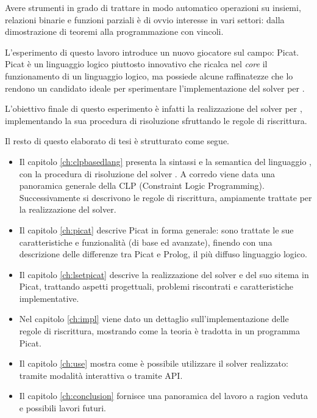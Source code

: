 \documentclass[12pt,a4paper,openright]{book}  %
\begin{document}
Avere strumenti in grado di trattare in modo automatico operazioni su
insiemi, relazioni binarie e funzioni parziali è di ovvio interesse in
vari settori: dalla dimostrazione di teoremi alla programmazione con
vincoli.

L'esperimento di questo lavoro introduce un nuovo giocatore sul campo:
Picat. Picat è un linguaggio logico piuttosto innovativo che ricalca
nel \textit{core} il funzionamento di un linguaggio logico, ma
possiede alcune raffinatezze che lo rendono un candidato ideale per
sperimentare l'implementazione del solver per \lset{}.

L'obiettivo finale di questo esperimento è infatti la realizzazione
del solver \satset{} per \lset{}, implementando la sua procedura di
risoluzione sfruttando le regole di riscrittura.

\bigskip

\noindent Il resto di questo elaborato di tesi è strutturato come
segue.
\begin{itemize}
	\item Il capitolo \ref{ch:clpbasedlang} presenta la sintassi e
          la semantica del linguaggio \lset{}, con la procedura di
          risoluzione del solver \satset{}. A corredo viene data una
          panoramica generale della CLP (Constraint Logic
          Programming). Successivamente si descrivono le regole di
          riscrittura, ampiamente trattate per la realizzazione del
          solver.
	\item Il capitolo \ref{ch:picat} descrive Picat in forma
          generale: sono trattate le sue caratteristiche e
          funzionalità (di base ed avanzate), finendo con una
          descrizione delle differenze tra Picat e Prolog, il più
          diffuso linguaggio logico.
	\item Il capitolo \ref{ch:lsetpicat} descrive la realizzazione
          del solver e del suo sitema in Picat, trattando aspetti
          progettuali, problemi riscontrati e caratteristiche
          implementative.
	\item Nel capitolo \ref{ch:impl} viene dato un dettaglio
          sull'implementazione delle regole di riscrittura, mostrando
          come la teoria è tradotta in un programma Picat.
	\item Il capitolo \ref{ch:use} mostra come è possibile
          utilizzare il solver realizzato: tramite modalità
          interattiva o tramite API.
	\item Il capitolo \ref{ch:conclusion} fornisce una panoramica
          del lavoro a ragion veduta e possibili lavori futuri.
\end{itemize}
\end{document}
